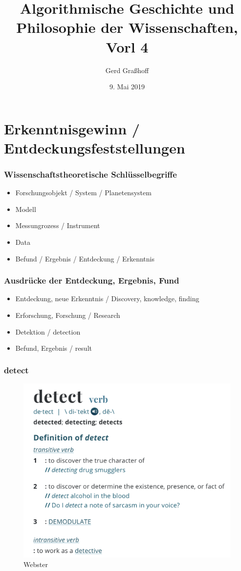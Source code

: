 \documentclass[11pt]{beamer}
\author{Gerd Graßhoff}
\title{Algorithmische Geschichte und Philosophie der Wissenschaften, Vorl 4}
\date{9. Mai 2019}
\begin{document}
	\begin{frame}[plain]
		\maketitle
	\end{frame}


\section{Erkenntnisgewinn / Entdeckungsfeststellungen}

	\begin{frame}
	\frametitle{Wissenschaftstheoretische Schlüsselbegriffe}
	\begin{itemize}
		\item Forschungsobjekt / System / Planetensystem
		\item Modell
		\item Messungrozess / Instrument
		\item Data
		\item Befund / Ergebnis / Entdeckung / Erkenntnis
	\end{itemize}
\end{frame}

	\begin{frame}
	\frametitle{Ausdrücke der Entdeckung, Ergebnis, Fund}
	\begin{itemize}
		\item Entdeckung, neue Erkenntnis / Discovery, knowledge, finding
		\item Erforschung, Forschung / Research
		\item Detektion / detection
		\item Befund, Ergebnis / result
	\end{itemize}
\end{frame}

	\begin{frame}
	\frametitle{detect}
\begin{figure}
	\centering
	\includegraphics[width=0.7\linewidth]{screenshot001}
	\caption{Webster}
	\label{fig:screenshot001}
\end{figure}
\end{frame}
\end{document}
